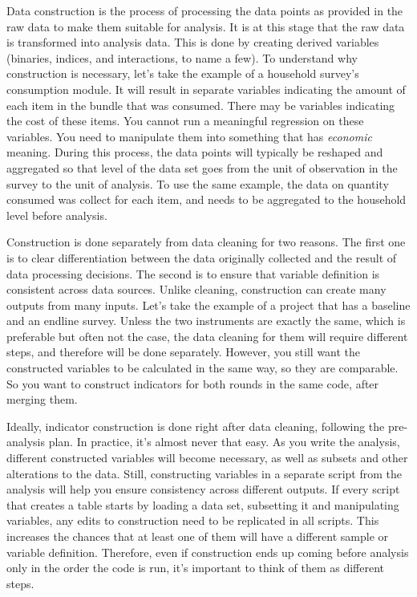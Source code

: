 Data construction is the process of processing the data points as provided in the raw data to make them suitable for analysis.
It is at this stage that the raw data is transformed into analysis data.
This is done by creating derived variables
(binaries, indices, and interactions, to name a few).
To understand why construction is necessary,
let's take the example of a household survey's consumption module.
It will result in separate variables indicating the 
amount of each item in the bundle that was consumed.
There may be variables indicating the cost of these items.
You cannot run a meaningful regression on these variables. 
You need to manipulate them into something that has \textit{economic} meaning. 
During this process, the data points will typically be reshaped and aggregated 
so that level of the data set goes from the unit of observation in the survey to the unit of analysis. 
To use the same example, the data on quantity consumed was collect for each item, and needs to be aggregated to the household level before analysis.


Construction is done separately from data cleaning for two reasons. 
The first one is to clear differentiation between the data originally collected and the result of data processing decisions.
The second is to ensure that variable definition is consistent across data sources. 
Unlike cleaning, construction can create many outputs from many inputs. 
Let's take the example of a project that has a baseline and an endline survey. 
Unless the two instruments are exactly the same, which is preferable but often not the case,  the data cleaning for them will require different steps, and therefore will be done separately. 
However, you still want the constructed variables to be calculated in the same way, so they are comparable.
So you want to construct indicators for both rounds in the same code, after merging them.

Ideally, indicator construction is done right after data cleaning, following the pre-analysis plan. 
In practice, it's almost never that easy.
As you write the analysis, different constructed variables will become necessary, as well as subsets and other alterations to the data.
Still, constructing variables in a separate script from the analysis will help you ensure consistency across different outputs. 
If every script that creates a table starts by loading a data set, subsetting it and manipulating variables, any edits to construction need to be replicated in all scripts. 
This increases the chances that at least one of them will have a different sample or variable definition.
Therefore, even if construction ends up coming before analysis only in the order the code is run,
it's important to think of them as different steps.


